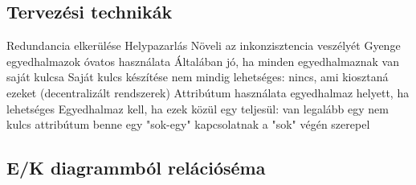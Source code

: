 \documentclass[12pt,a4paper]{article}
\begin{document}
\pagebreak

\subsection{Tervezési technikák}

\begin{outline}
	\1 Redundancia elkerülése
		\2 Helypazarlás
		\2 Növeli az inkonzisztencia veszélyét
	\1 Gyenge egyedhalmazok óvatos használata
		\2 Általában jó, ha minden egyedhalmaznak van saját kulcsa
		\2 Saját kulcs készítése nem mindig lehetséges: nincs, ami kiosztaná ezeket (decentralizált rendszerek)
	\1 Attribútum használata egyedhalmaz helyett, ha lehetséges
		\2 Egyedhalmaz kell, ha ezek közül egy teljesül:
			\3 van legalább egy nem kulcs attribútum benne
			\3 egy "sok-egy" kapcsolatnak a "sok" végén szerepel
\end{outline}

\subsection{E/K diagrammból relációséma}
\end{document}
